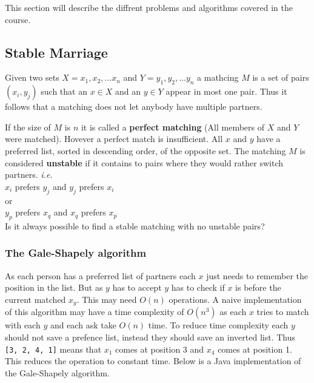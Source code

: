 \documentclass[12pt]{article} %
\begin{document}
This section will describe the diffrent problems and algorithms covered in the course.

\subsection{Stable Marriage} %
Given two sets $X = {x_{1}, x_{2}, \dots x_{n}}$ and $Y = {y_{1}, y_{2}, \dots y_{n}}$ a mathcing $M$ is a set of pairs $(x_{i}, y_{j})$ such that an $x \in X$ and an $y \in Y$ appear in most one pair. Thus it follows that a matching does not let anybody have multiple partners.

\par If the size of $M$ is $n$ it is called a \textbf{perfect matching} (All members of $X$ and $Y$ were matched). Hovever a perfect match is insufficient. All $x$ and $y$ have a preferred list, sorted in descending order, of the opposite set. The matching $M$ is considered \textbf{unstable} if it contains to pairs where they would rather switch partners. \textit{i.e.}\\
$x_{i}$ prefers $y_{j}$ and $y_{j}$ prefers $x_{i}$ \\
or \\
$y_{p}$ prefers $x_{q}$ and $x_{q}$ prefers $x_{p}$ \\
Is it always possible to find a stable matching with no unstable pairs?

\subsubsection{The Gale-Shapely algorithm}
As each person has a preferred list of partners each $x$ just needs to remember the position in the list. But as $y$ has to accept $y$ has to check if $x$ is before the current matched $x_{y}$. This may need $O(n)$ operations. A naive implementation of this algorithm may have a time complexity of $O(n^3)$ as each $x$ tries to match with each $y$ and each ask take $O(n)$ time. To reduce time complexity each $y$ should not save a prefence list, instead they should save an inverted list. Thus \texttt{[3, 2, 4, 1]} means that $x_{1}$ comes at position 3 and $x_{4}$ comes at position 1. This reduces the operation to constant time. Below is a Java implementation of the Gale-Shapely algorithm.
\end{document}
